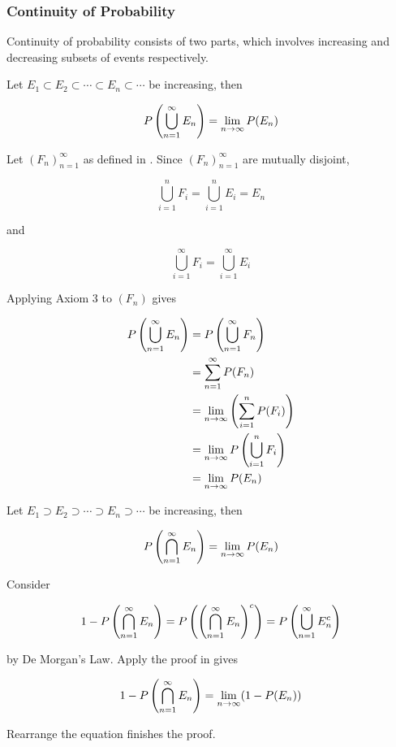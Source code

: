 \documentclass[a4paper,12pt]{article}
\begin{document}
\subsubsection{Continuity of Probability}
Continuity of probability consists of two parts, which involves increasing and decreasing subsets of events respectively.
\begin{pst}
  Let $E_{1}\subset E_{2}\subset\cdots\subset E_{n}\subset\cdots$ be increasing, then

  $$P\left( \bigcup_{n=1}^{\infty}E_{n}\right)=\lim_{n\to\infty}P(E_{n})$$\s

  \prf Let $(F_{n})_{n=1}^{\infty}$ as defined in . Since $(F_{n})_{n=1}^{\infty}$ are mutually disjoint,

  $$\bigcup_{i=1}^{n}F_{i}=\bigcup_{i=1}^{n}E_{i}=E_{n}$$\s

  and

  $$\bigcup_{i=1}^{\infty}F_{i}=\bigcup_{i=1}^{\infty}E_{i}$$\s

  Applying Axiom $3$ to $(F_{n})$ gives

  $$\begin{aligned}[t]
    P\left( \bigcup_{n=1}^{\infty}E_{n}\right)&=P\left( \bigcup_{n=1}^{\infty}F_{n}\right)\\
    &=\sum_{n=1}^{\infty}P(F_{n})\\
    &=\lim_{n\to\infty}\left( \sum_{i=1}^{n}P(F_{i})\right)\\
    &=\lim_{n\to\infty}P\left( \bigcup_{i=1}^{n}F_{i}\right)\\
    &=\lim_{n\to\infty}P(E_{n})
  \end{aligned}$$
\end{pst}\n

\begin{pst}
  Let $E_{1}\supset E_{2}\supset\cdots\supset E_{n}\supset\cdots$ be increasing, then

  $$P\left( \bigcap_{n=1}^{\infty}E_{n}\right)=\lim_{n\to\infty}P(E_{n})$$\s
  
  \prf Consider

  $$1-P\left( \bigcap_{n=1}^{\infty}E_{n}\right)=P\left( \left( \bigcap_{n=1}^{\infty}E_{n}\right)^{c}\right)=P\left( \bigcup_{n=1}^{\infty}E_{n}^{c}\right)$$\s

  by De Morgan's Law. Apply the proof in \rpst[\sctr{1}] gives

  $$1-P\left( \bigcap_{n=1}^{\infty}E_{n}\right)=\lim_{n\to\infty}(1-P(E_{n}))$$\s

  Rearrange the equation finishes the proof.
\end{pst}
\end{document}
